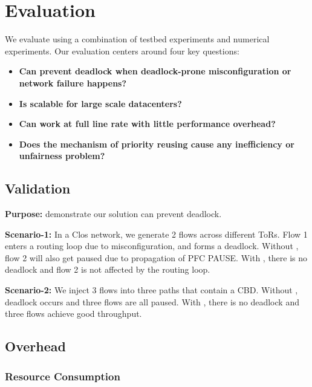 \section{Evaluation}\label{sec:eval}

We evaluate \sysname{} using a combination of testbed experiments and numerical experiments. Our evaluation centers around four key questions:

\begin{itemize}
	\item \textbf{Can \sysname{} prevent deadlock when deadlock-prone misconfiguration or network failure happens?}
	
	\item \textbf{Is \sysname{} scalable for large scale datacenters?}
	
	\item \textbf{Can \sysname{} work at full line rate with little performance overhead?}
	
	\item \textbf{Does the mechanism of priority reusing cause any inefficiency or unfairness problem?} 
	
\end{itemize}

\subsection{Validation}\label{subsec:exp_validation}

\textbf{Purpose:} demonstrate our solution can prevent deadlock.

\textbf{Scenario-1:} In a Clos network, we generate 2 flows across different ToRs. Flow 1 enters a routing loop due to misconfiguration, and forms a deadlock. Without \sysname{}, flow 2 will also get paused due to propagation of PFC PAUSE. With \sysname{}, there is no deadlock and flow 2 is not affected by the routing loop.

\textbf{Scenario-2:} We inject 3 flows into three paths that contain a CBD. Without \sysname{}, deadlock occurs and three flows are all paused. With \sysname{}, there is no deadlock and three flows achieve good throughput.

\subsection{Overhead}\label{subsec:exp_overhead}

\subsubsection{Resource Consumption}\label{subsec:exp_resourceconsump}


